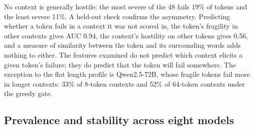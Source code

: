 \documentclass[11pt]{article}
\begin{document}
No context is generally hostile: the most severe of the 48 fails 19\% of tokens and the least severe 11\%. A held-out check confirms the asymmetry. Predicting whether a token fails in a context it was not scored in, the token's fragility in other contexts gives AUC 0.94, the context's hostility on other tokens gives 0.56, and a measure of similarity between the token and its surrounding words adds nothing to either. The features examined do not predict which context elicits a given token's failure; they do predict that the token will fail somewhere. The exception to the flat length profile is Qwen2.5-72B, whose fragile tokens fail more in longer contexts: 33\% of 8-token contexts and 52\% of 64-token contexts under the greedy gate.

\subsection{Prevalence and stability across eight models}\label{prevalence-and-stability-across-eight-models}

\begingroup\scriptsize\setlength{\tabcolsep}{4pt}\renewcommand{\arraystretch}{1.15}
\end{document}
